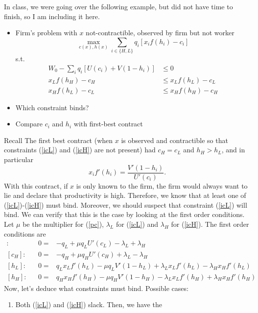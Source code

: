\begin{example}
  In class, we were going over the following example, but did not have
  time to finish, so I am including it here.
  \begin{itemize}
  \item  Firm's problem with $x$ not-contractible, observed by firm but not worker
    \[ \max_{c(x), h(x)} \sum_{i \in \{H,L\}} q_i [x_i f(h_i)-c_i] \]
    s.t. 
    \begin{align} 
      W_0 - \sum_i q_i[U(c_i) + V(1-h_i)] & \leq 0 \label{pc} \\
      x_L f(h_H) - c_H & \leq x_L f(h_L) - c_L \label{icL} \\
      x_H f(h_L) - c_L & \leq x_H f(h_H) - c_H \label{icH}
    \end{align}
  \item Which constraint binds?
  \item Compare $c_i$ and $h_i$ with first-best contract
  \end{itemize}
  Recall The first best contract (when $x$ is observed and
  contractible so that constraints (\ref{icL}) and (\ref{icH}) are not
  present) had 
  $c_H = c_L$ and $h_H > h_L$, and in particular 
  \[ x_i f'(h_i) = \frac{V'(1-h_i)}{U'(c_i)}. \] 
  With this contract, if $x$ is only known to the firm, the firm would
  always want to lie and declare that productivity is high. Therefore,
  we know that at least one of (\ref{icL})-(\ref{icH}) must
  bind. Moreover, we should suspect that constraint (\ref{icL}) will
  bind. We can verify that this is the case by looking at the first
  order conditions. Let $\mu$ be the multiplier for (\ref{pc}),
  $\lambda_L$ for (\ref{icL}) and $\lambda_H$ for (\ref{icH}). The
  first order conditions are
  \begin{align*}
    [c_L]: && 0 = & -q_L + \mu q_L U'(c_L) - \lambda_L + \lambda_H \\
    [c_H]: && 0 = & -q_H + \mu q_H U'(c_H) + \lambda_L - \lambda_H \\
    [h_L]: && 0 = & q_L x_L f'(h_L) - \mu q_L V'(1-h_L) + \lambda_L
                    x_L f'(h_L) - \lambda_H x_H f'(h_L) \\
    [h_H]: && 0 = & q_H x_H f'(h_H) - \mu q_H V'(1-h_H) - \lambda_L
                    x_L f'(h_H) + \lambda_H x_Hf'(h_H) 
  \end{align*}
  Now, let's deduce what constraints must bind. Possible cases:
  \begin{enumerate}
  \item Both (\ref{icL}) and (\ref{icH}) slack. Then, we have the

\end{enumerate}
\end{example}
